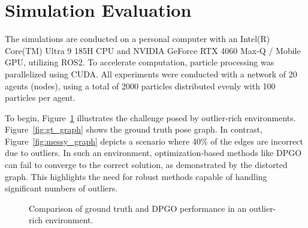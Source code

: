 \section{Simulation Evaluation}
\label{sec:evaluation}

The simulations are conducted on a personal computer with an Intel(R) Core(TM) Ultra 9 185H CPU and NVIDIA GeForce RTX 4060 Max-Q / Mobile GPU, utilizing ROS2. To accelerate computation, particle processing was parallelized using CUDA. All experiments were conducted with a network of 20 agents (nodes), using a total of 2000 particles distributed evenly with 100 particles per agent.

To begin, Figure~\ref{fig:gt_messy_comparison} illustrates the challenge posed by outlier-rich environments.
Figure~\ref{fig:gt_graph} shows the ground truth pose graph. In contrast, Figure~\ref{fig:messy_graph} depicts a scenario where 40\% of the edges are incorrect due to outliers. In such an environment, optimization-based methods like DPGO can fail to converge to the correct solution, as demonstrated by the distorted graph. This highlights the need for robust methods capable of handling significant numbers of outliers.

\begin{figure}[H]
    \centering
    \hfill
    \caption{Comparison of ground truth and DPGO performance in an outlier-rich environment.}
    \label{fig:gt_messy_comparison}
\end{figure}


